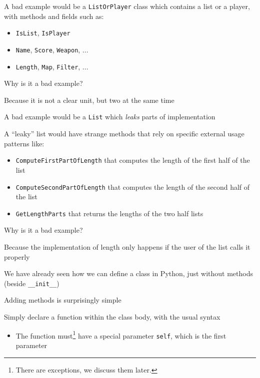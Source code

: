 \documentclass{beamer}
\begin{document}
\begin{slide}{
\item A bad example would be a \texttt{ListOrPlayer} class which contains a list or a player, with methods and fields such as:
\begin{itemize}
\item \texttt{IsList}, \texttt{IsPlayer}
\item \texttt{Name}, \texttt{Score}, \texttt{Weapon}, ...
\item \texttt{Length}, \texttt{Map}, \texttt{Filter}, ...
\end{itemize}
\item Why is it a bad example?
\pause
\item Because it is not a clear unit, but two at the same time
}\end{slide}

\begin{slide}{
\item A bad example would be a \texttt{List} which \textit{leaks} parts of implementation
\item A ``leaky'' list would have strange methods that rely on specific external usage patterns like:
\begin{itemize}
\item \texttt{ComputeFirstPartOfLength} that computes the length of the first half of the list
\item \texttt{ComputeSecondPartOfLength} that computes the length of the second half of the list
\item \texttt{GetLengthParts} that returns the lengths of the two half lists
\end{itemize}
\item Why is it a bad example?
\pause
\item Because the implementation of length only happens if the user of the list calls it properly
}\end{slide}

\begin{slide}{
\item We have already seen how we can define a class in Python, just without methods (beside \texttt{\_\_init\_\_})
\item Adding methods is surprisingly simple
\item Simply declare a function within the class body, with the usual syntax
\begin{itemize}
\item The function must\footnote{There are exceptions, we discuss them later.} have a special parameter \texttt{self}, which is the first parameter
\end{itemize}
}\end{slide}
\end{document}
